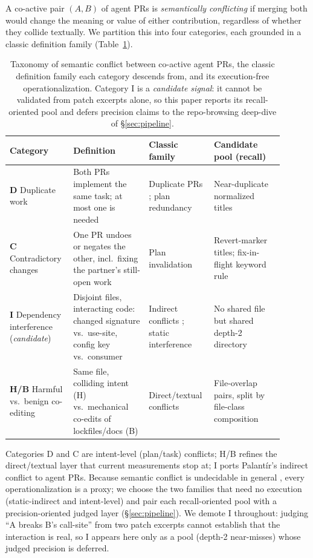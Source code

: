 \documentclass{article}
\begin{document}
A co-active pair $(A,B)$ of agent PRs is \emph{semantically conflicting} if merging both would change the meaning or value of either contribution, regardless of whether they collide textually. We partition this into four categories, each grounded in a classic definition family (Table~\ref{tab:taxonomy}).

\begin{table}[t]
\centering
\caption{Taxonomy of semantic conflict between co-active agent PRs, the classic definition family each category descends from, and its execution-free operationalization. Category I is a \emph{candidate signal}: it cannot be validated from patch excerpts alone, so this paper reports its recall-oriented pool and defers precision claims to the repo-browsing deep-dive of \S\ref{sec:pipeline}.}
\label{tab:taxonomy}
\small
\begin{tabular}{@{}p{0.20\linewidth}p{0.26\linewidth}p{0.20\linewidth}p{0.24\linewidth}@{}}
\toprule
Category & Definition & Classic family & Candidate pool (recall) \\
\midrule
\textbf{D} Duplicate work & Both PRs implement the same task; at most one is needed & Duplicate PRs \citep{duppr}; plan redundancy & Near-duplicate normalized titles \\
\textbf{C} Contradictory changes & One PR undoes or negates the other, incl.\ fixing the partner's still-open work & Plan invalidation \citep{coagent,cognition2025} & Revert-marker titles; fix-in-flight keyword rule \\
\textbf{I} Dependency interference (\emph{candidate}) & Disjoint files, interacting code: changed signature vs.\ use-site, config key vs.\ consumer & Indirect conflicts \citep{palantir}; static interference \citep{dejesus2023static} & No shared file but shared depth-2 directory \\
\textbf{H/B} Harmful vs.\ benign co-editing & Same file, colliding intent (H) vs.\ mechanical co-edits of lockfiles/docs (B) & Direct/textual conflicts \citep{mens2002survey} & File-overlap pairs, split by file-class composition \\
\bottomrule
\end{tabular}
\end{table}

Categories D and C are intent-level (plan/task) conflicts; H/B refines the direct/textual layer that current measurements stop at; I ports Palant\'ir's indirect conflict to agent PRs. Because semantic conflict is undecidable in general \citep{mens2002survey}, every operationalization is a proxy; we choose the two families that need no execution (static-indirect and intent-level) and pair each recall-oriented pool with a precision-oriented judged layer (\S\ref{sec:pipeline}). We demote I throughout: judging ``A breaks B's call-site'' from two patch excerpts cannot establish that the interaction is real, so I appears here only as a pool (depth-2 near-misses) whose judged precision is deferred.
\end{document}
